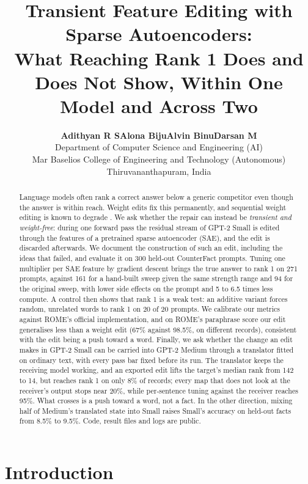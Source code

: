 \documentclass[11pt,twocolumn]{article}
\title{\bfseries\Large Transient Feature Editing with Sparse Autoencoders:\\
What Reaching Rank 1 Does and Does Not Show, Within One Model and Across Two}
\author{\textbf{Adithyan R S\quad Alona Biju\quad Alvin Binu\quad Darsan M}\\
Department of Computer Science and Engineering (AI)\\
Mar Baselios College of Engineering and Technology (Autonomous)\\
Thiruvananthapuram, India}
\date{}
\begin{document}
\maketitle

\begin{abstract}
\small
Language models often rank a correct answer below a generic competitor even though the answer is within reach. Weight edits fix this permanently, and sequential weight editing is known to degrade \citep{gupta2024}. We ask whether the repair can instead be \emph{transient and weight-free}: during one forward pass the residual stream of GPT-2 Small is edited through the features of a pretrained sparse autoencoder (SAE), and the edit is discarded afterwards. We document the construction of such an edit, including the ideas that failed, and evaluate it on 300 held-out CounterFact prompts. Tuning one multiplier per SAE feature by gradient descent brings the true answer to rank 1 on 271 prompts, against 161 for a hand-built sweep given the same strength range and 94 for the original sweep, with lower side effects on the prompt and 5 to 6.5 times less compute. A control then shows that rank 1 is a weak test: an additive variant forces random, unrelated words to rank 1 on 20 of 20 prompts. We calibrate our metrics against ROME's official implementation, and on ROME's paraphrase score our edit generalises less than a weight edit (67\% against 98.5\%, on different records), consistent with the edit being a push toward a word. Finally, we ask whether the change an edit makes in GPT-2 Small can be carried into GPT-2 Medium through a translator fitted on ordinary text, with every pass bar fixed before its run. The translator keeps the receiving model working, and an exported edit lifts the target's median rank from 142 to 14, but reaches rank 1 on only 8\% of records; every map that does not look at the receiver's output stops near 20\%, while per-sentence tuning against the receiver reaches 95\%. What crosses is a push toward a word, not a fact. In the other direction, mixing half of Medium's translated state into Small raises Small's accuracy on held-out facts from 8.5\% to 9.5\%. Code, result files and logs are public.
\end{abstract}

\section{Introduction}
\label{sec:intro}
\end{document}
